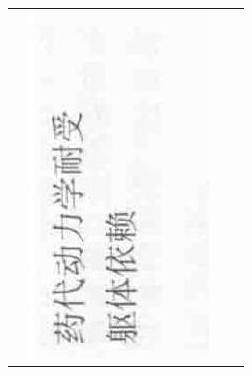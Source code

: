 \documentclass[10pt]{article}
\begin{document}
\begin{center}
\begin{tabular}{|c|c|c|c|}
 & \includegraphics[max width=\textwidth]{2024_07_05_645bb794a4d4f32ee0c8g-332(12)}

\end{tabular}
\end{center}
\end{document}
